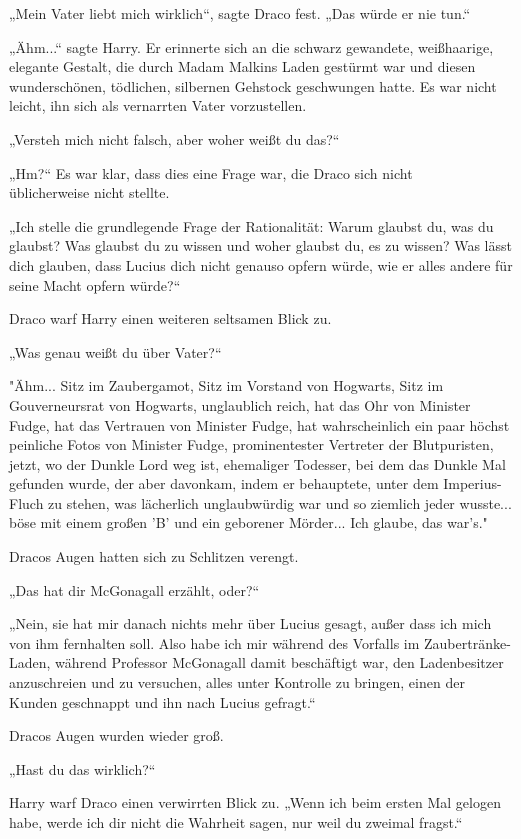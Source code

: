 {„Mein Vater liebt mich wirklich“, sagte Draco fest. „Das würde er nie tun.“

„Ähm...“ sagte Harry. Er erinnerte sich an die schwarz gewandete, weißhaarige, elegante Gestalt, die durch Madam Malkins Laden gestürmt war und diesen wunderschönen, tödlichen, silbernen Gehstock geschwungen hatte. Es war nicht leicht, ihn sich als vernarrten Vater vorzustellen.

„Versteh mich nicht falsch, aber woher weißt du das?“

„Hm?“ Es war klar, dass dies eine Frage war, die Draco sich nicht\\ üblicherweise nicht stellte.

„Ich stelle die grundlegende Frage der Rationalität: Warum glaubst du, was du glaubst? Was glaubst du zu wissen und woher glaubst du, es zu wissen? Was lässt dich glauben, dass Lucius dich nicht genauso opfern würde, wie er alles andere für seine Macht opfern würde?“

Draco warf Harry einen weiteren seltsamen Blick zu.

„Was genau weißt du über Vater?“

"Ähm... Sitz im Zaubergamot, Sitz im Vorstand von Hogwarts, Sitz im Gouverneursrat von Hogwarts, unglaublich reich, hat das Ohr von Minister Fudge, hat das Vertrauen von Minister Fudge, hat wahrscheinlich ein paar höchst peinliche Fotos von Minister Fudge, prominentester Vertreter der Blutpuristen, jetzt, wo der Dunkle Lord weg ist, ehemaliger Todesser, bei dem das Dunkle Mal gefunden wurde, der aber davonkam, indem er behauptete, unter dem Imperius-Fluch zu stehen, was lächerlich unglaubwürdig war und so ziemlich jeder wusste... böse mit einem großen 'B' und ein geborener Mörder... Ich glaube, das war's."

Dracos Augen hatten sich zu Schlitzen verengt.

„Das hat dir McGonagall erzählt, oder?“

„Nein, sie hat mir danach nichts mehr über Lucius gesagt, außer dass ich mich von ihm fernhalten soll. Also habe ich mir während des Vorfalls im Zaubertränke-Laden, während Professor McGonagall damit beschäftigt war, den Ladenbesitzer anzuschreien und zu versuchen, alles unter Kontrolle zu bringen, einen der Kunden geschnappt und ihn nach Lucius gefragt.“

Dracos Augen wurden wieder groß.

„Hast du das wirklich?“

Harry warf Draco einen verwirrten Blick zu. „Wenn ich beim ersten Mal gelogen habe, werde ich dir nicht die Wahrheit sagen, nur weil du zweimal fragst.“

}
